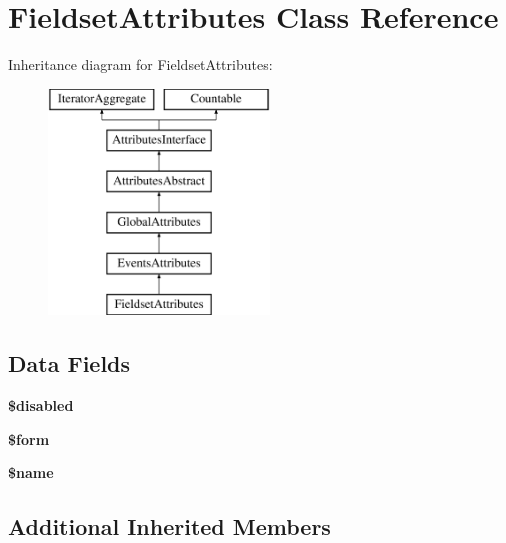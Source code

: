 \hypertarget{class_pes_1_1_dom_1_1_node_1_1_attributes_1_1_fieldset_attributes}{}\section{Fieldset\+Attributes Class Reference}
\label{class_pes_1_1_dom_1_1_node_1_1_attributes_1_1_fieldset_attributes}
Inheritance diagram for Fieldset\+Attributes\+:\begin{figure}[H]
\begin{center}
\leavevmode
\includegraphics[height=6.000000cm]{class_pes_1_1_dom_1_1_node_1_1_attributes_1_1_fieldset_attributes}
\end{center}
\end{figure}
\subsection*{Data Fields}
\begin{DoxyCompactItemize}
\item 
\mbox{\label{class_pes_1_1_dom_1_1_node_1_1_attributes_1_1_fieldset_attributes_a6c108f5b26242d862f6e51869fbfd271}} 
{\bfseries \$disabled}
\item 
\mbox{\label{class_pes_1_1_dom_1_1_node_1_1_attributes_1_1_fieldset_attributes_a1a4fda4c28a9ee5f91102c023b9501f4}} 
{\bfseries \$form}
\item 
\mbox{\label{class_pes_1_1_dom_1_1_node_1_1_attributes_1_1_fieldset_attributes_ab2fc40d43824ea3e1ce5d86dee0d763b}} 
{\bfseries \$name}
\end{DoxyCompactItemize}
\subsection*{Additional Inherited Members}


